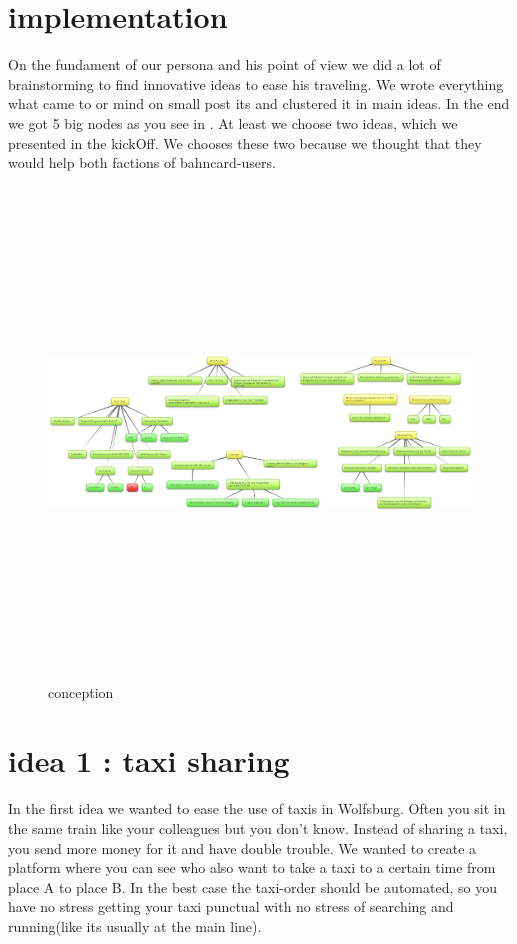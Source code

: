 
\section{implementation}

On the fundament of our persona and his point of view we did a lot of brainstorming to find innovative ideas to ease his
traveling. We wrote everything what came to or mind on small post its and clustered it in main ideas. In the end we got 5 big
nodes as you see in . At least we choose two ideas, which we presented in the kickOff. We chooses these
two because we thought that they would help both factions of bahncard-users.

\begin{figure}[!h]
	\includegraphics[width=1.0\textwidth, height=130mm]{images/konzeption.png}
	\caption{conception}
	\label{fig:conception}
\end{figure}

\clearpage

\section{idea 1 : taxi sharing}

In the first idea we wanted to ease the use of taxis in Wolfsburg. Often you sit in the same train like your colleagues but you
don't know. Instead of sharing a taxi, you send more money for it and have double trouble. We wanted to create a platform where
you can see who also want to take a taxi to a certain time from place A to place B. In the best case the taxi-order should be
automated, so you have no stress getting your taxi punctual with no stress of searching and running(like its usually at the main
line).

